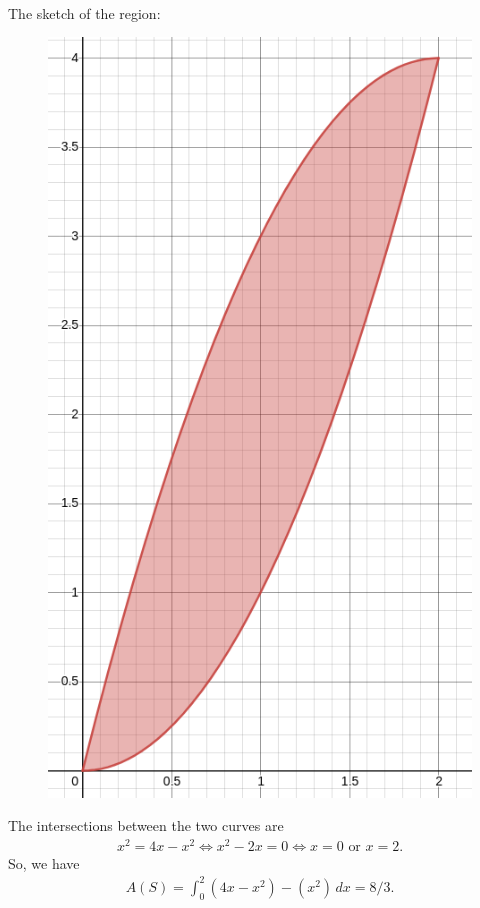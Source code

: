 	\\
	The sketch of the region:
		\begin{figure}[h]
		\centering
		\includegraphics[scale=0.3]{exo-14}
		\end{figure}
		
	The intersections between the two curves are
		\begin{align*}
		x^2 = 4x - x^2 \iff x^2 - 2x = 0 \iff x = 0 \text{ or } x = 2 .
		\end{align*}
	So, we have
		\begin{align*}
		A (S) = \int_0^2 (4x - x^2) - (x^2) \, dx = 8/3 .
		\end{align*}
	
